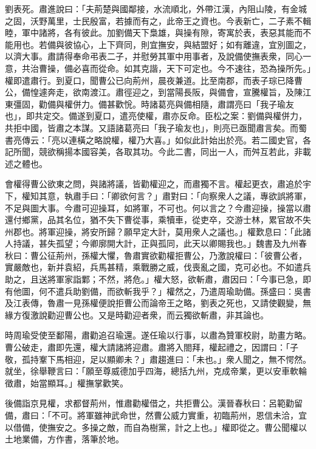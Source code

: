 \begin{pinyinscope}
劉表死。肅進說曰：「夫荊楚與國鄰接，水流順北，外帶江漢，內阻山陵，有金城之固，沃野萬里，士民殷富，若據而有之，此帝王之資也。今表新亡，二子素不輯睦，軍中諸將，各有彼此。加劉備天下梟雄，與操有隙，寄寓於表，表惡其能而不能用也。若備與彼協心，上下齊同，則宜撫安，與結盟好；如有離違，宜別圖之，以濟大事。肅請得奉命弔表二子，并慰勞其軍中用事者，及說備使撫表衆，同心一意，共治曹操，備必喜而從命。如其克諧，天下可定也。今不速往，恐為操所先。」權即遣肅行。到夏口，聞曹公已向荊州，晨夜兼道。比至南郡，而表子琮已降曹公，備惶遽奔走，欲南渡江。肅徑迎之，到當陽長阪，與備會，宣騰權旨，及陳江東彊固，勸備與權併力。備甚歡恱。時諸葛亮與備相隨，肅謂亮曰「我子瑜友也」，即共定交。備遂到夏口，遣亮使權，肅亦反命。臣松之案：劉備與權併力，共拒中國，皆肅之本謀。又語諸葛亮曰「我子瑜友也」，則亮已亟聞肅言矣。而蜀書亮傳云：「亮以連橫之略說權，權乃大喜。」如似此計始出於亮。若二國史官，各記所聞，競欲稱揚本國容美，各取其功。今此二書，同出一人，而舛互若此，非載述之體也。

會權得曹公欲東之問，與諸將議，皆勸權迎之，而肅獨不言。權起更衣，肅追於宇下，權知其意，執肅手曰：「卿欲何言？」肅對曰：「向察衆人之議，專欲誤將軍，不足與圖大事。今肅可迎操耳，如將軍，不可也。何以言之？今肅迎操，操當以肅還付鄉黨，品其名位，猶不失下曹從事，乘犢車，從吏卒，交游士林，累官故不失州郡也。將軍迎操，將安所歸？願早定大計，莫用衆人之議也。」權歎息曰：「此諸人持議，甚失孤望；今卿廓開大計，正與孤同，此天以卿賜我也。」魏書及九州春秋曰：曹公征荊州，孫權大懼，魯肅實欲勸權拒曹公，乃激說權曰：「彼曹公者，實嚴敵也，新并袁紹，兵馬甚精，乘戰勝之威，伐喪亂之國，克可必也。不如遣兵助之，且送將軍家詣鄴；不然，將危。」權大怒，欲斬肅，肅因曰：「今事已急，即有他圖，何不遣兵助劉備，而欲斬我乎？」權然之，乃遣周瑜助備。孫盛曰：吳書及江表傳，魯肅一見孫權便說拒曹公而論帝王之略，劉表之死也，又請使觀變，無緣方復激說勸迎曹公也。又是時勸迎者衆，而云獨欲斬肅，非其論也。

時周瑜受使至鄱陽，肅勸追召瑜還。遂任瑜以行事，以肅為贊軍校尉，助畫方略。曹公破走，肅即先還，權大請諸將迎肅。肅將入閤拜，權起禮之，因謂曰：「子敬，孤持鞌下馬相迎，足以顯卿未？」肅趨進曰：「未也。」衆人聞之，無不愕然。就坐，徐舉鞭言曰：「願至尊威德加乎四海，總括九州，克成帝業，更以安車軟輪徵肅，始當顯耳。」權撫掌歡笑。

後備詣京見權，求都督荊州，惟肅勸權借之，共拒曹公。漢晉春秋曰：呂範勸留備，肅曰：「不可。將軍雖神武命世，然曹公威力實重，初臨荊州，恩信未洽，宜以借備，使撫安之。多操之敵，而自為樹黨，計之上也。」權即從之。曹公聞權以土地業備，方作書，落筆於地。


\end{pinyinscope}
